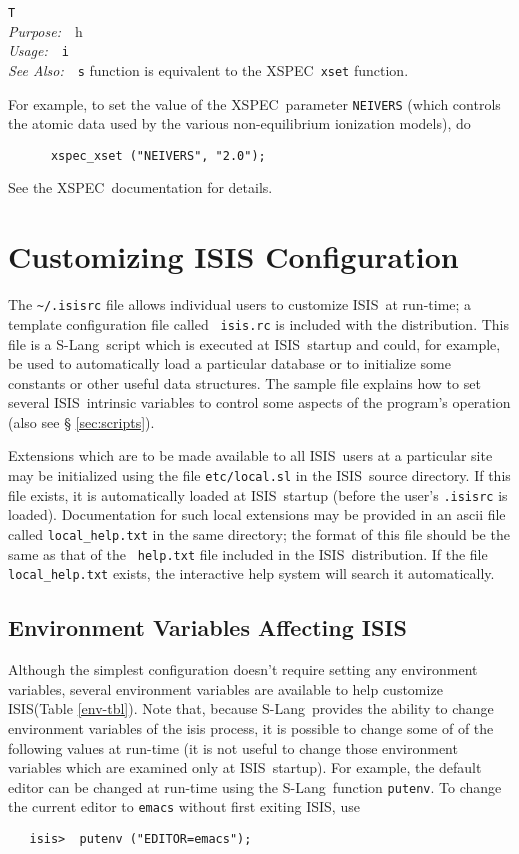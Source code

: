 \documentclass{book}
\makeatletter
\newif\ifpdf
\newcommand{\isisx}{{\sc ISIS~}}
\newcommand{\isis}{{\sc ISIS}}
\newcommand{\slang}{{\sc S-Lang}}
\newcommand{\xspec}{{\sc XSPEC}}
\newenvironment{isisfunction}[4]%
{\index{{#1}@{\tt #1}}%
  \ifpdf
  \else
     \addcontentsline{toc}{subsection}{{#1} -- {#2}}
  \fi
  \vbox{
          \vspace*{\baselineskip}
          {\LARGE\tt #1}\vspace*{\baselineskip}\\
          {{\it Purpose:}~~{#2}}\\
          {{\it Usage:}~~{\tt #3}}\\
          {{\it See Also:}~~{\tt #4}}
       }
}%
{ }
\makeatother
\begin{document}
{\begin{isisfunction}
This function is equivalent to the \xspec\ \verb|xset| function.

For example, to set the value of the \xspec\ parameter
\verb|NEIVERS| (which controls the atomic data used by the
various non-equilibrium ionization models), do
\begin{verbatim}
      xspec_xset ("NEIVERS", "2.0");
\end{verbatim}
See the \xspec\ documentation for details.
\end{isisfunction}

\chapter{Customizing ISIS Configuration}
\label{chap:custom}

The \verb|~/.isisrc| file allows individual users to customize
\isisx at run-time; a template configuration file called {\tt
isis.rc} is included with the distribution. This file is a \slang{}ript which is executed at \isisx startup and could, for example,
be used to automatically load a particular database or to
initialize some constants or other useful data structures. The
sample file explains how to set several \isisx intrinsic variables
to control some aspects of the program's operation (also see \S
\ref{sec:scripts}).

Extensions which are to be made
available to all \isisx users at a particular site may be
initialized using the file {\tt etc/local.sl} in the \isisx source
directory. If this file exists, it is automatically loaded at
\isisx startup (before the user's {\tt .isisrc} is loaded).
Documentation for such local extensions may be provided in an
ascii file called {\tt local\_help.txt} in the same directory; the
format of this file should be the same as that of the {\tt
help.txt} file included in the \isisx distribution.  If the file
{\tt local\_help.txt} exists, the interactive help system will
search it automatically.

\section{Environment Variables Affecting ISIS}
\label{sec:env-var}

Although the simplest configuration doesn't require setting any
environment variables, several environment variables are available to
help customize \isis (Table \ref{env-tbl}).  Note that, because \slang\
provides the ability to change environment variables of the isis process, it
is possible to change some of of the following values at run-time
(it is not useful to change those environment variables which are examined
only at \isisx startup).  For example, the default editor can be changed at
run-time using the \slang\ function {\tt putenv}.  To change the current
editor to {\tt emacs} without first exiting \isis, use
\begin{verbatim}
   isis>  putenv ("EDITOR=emacs");
\end{verbatim}

}
\end{document}
